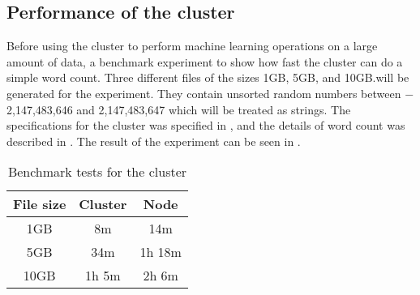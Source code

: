 \subsection{Performance of the cluster}\label{sec:benchmark}
Before using the cluster to perform machine learning operations on a large amount of data, a benchmark experiment to show how fast the cluster can do a simple word count. Three different files of the sizes 1GB, 5GB, and 10GB.\@ will be generated for the experiment. They contain unsorted random numbers between $-$2,147,483,646 and 2,147,483,647 which will be treated as strings. The specifications for the cluster was specified in , and the details of word count was described in . The result of the experiment can be seen in . 
\begin{table}[!htb]
  \centering
  \begin{tabular}{|c|c c|}
    \hline
    File size & Cluster & Node \\
    \hline
    1GB & 8m & 14m\\ %
    5GB & 34m & 1h 18m \\ %
    10GB & 1h 5m & 2h 6m \\ %
    \hline
  \end{tabular}
  \caption{Benchmark tests for the cluster}
  \label{tab:bench}
\end{table}

